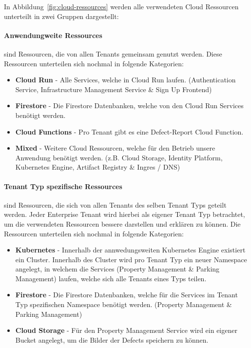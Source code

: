 In Abbildung~\ref{fig:cloud-ressources} werden alle verwendeten Cloud Ressourcen unterteilt in zwei Gruppen dargestellt:
\paragraph{Anwendungweite Ressources} sind Ressourcen, die von allen Tenants gemeinsam genutzt werden. 
Diese Ressourcen unterteilen sich nochmal in folgende Kategorien:
\begin{itemize}
  \item \textbf{Cloud Run} - Alle Services, welche in Cloud Run laufen. (Authentication Service, Infrastructure Management Service \& Sign Up Frontend)
  \item \textbf{Firestore} - Die Firestore Datenbanken, welche von den Cloud Run Services benötigt werden.
  \item \textbf{Cloud Functions} - Pro Tenant gibt es eine Defect-Report Cloud Function.
  \item \textbf{Mixed} - Weitere Cloud Ressourcen, welche für den Betrieb unsere Anwendung benötigt werden. (z.B. Cloud Storage, Identity Platform, Kubernetes Engine, Artifact Registry \& Ingres / DNS) 
\end{itemize}

\paragraph{Tenant Typ spezifische Ressources} sind Ressourcen, die sich von allen Tenants des selben Tenant Typs geteilt werden.
Jeder Enterprise Tenant wird hierbei als eigener Tenant Typ betrachtet, um die verwendeten Ressourcen bessere darstellen und erklären zu können. 
Die Ressourcen unterteilen sich nochmal in folgende Kategorien:
\begin{itemize}
  \item \textbf{Kubernetes} - Innerhalb der annwedungsweiten Kubernetes Engine existiert ein Cluster. Innerhalb des Cluster wird pro Tenant Typ ein neuer Namespace angelegt, in welchem die Services (Property Management \& Parking Management) laufen, welche sich alle Tenants eines Typs teilen.
  \item \textbf{Firestore} - Die Firestore Datenbanken, welche für die Services im Tenant Typ spezifischen Namespace benötigt werden. (Property Management \& Parking Management)
  \item \textbf{Cloud Storage} - Für den Property Management Service wird ein eigener Bucket angelegt, um die Bilder der Defects speichern zu können.
\end{itemize}

